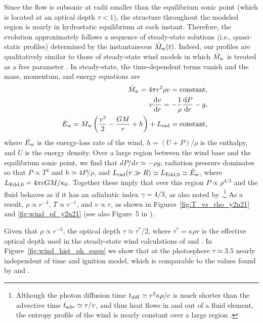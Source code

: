 \documentclass[apj,usenatbib, iop, twocolappendix]{emulateapj}
\newcommand{\Frad}{F}
\newcommand{\Lrad}{L_{\rm rad}}
\newcommand{\Mdot}{\dot{M}_{\rm w}}
\newcommand{\Edot}{\dot{E}_{\rm w}}
\newcommand{\diff}{\text{d}}
\begin{document}
Since the flow is subsonic at radii smaller than the equilibrium sonic point (which is located  at an optical depth $\tau<1$), the structure throughout the modeled region is nearly in hydrostatic equilibrium at each instant.  Therefore, the evolution approximately follows a sequence of steady-state solutions (i.e., quasi-static profiles) determined by the instantaneous $\Mdot(t)$. Indeed, our profiles are qualitatively similar to those of  steady-state wind models in which $\Mdot$ is treated as a free parameter \citep{Ebisuzaki:83, Kato:83, Paczynski:86, Joss:87}.  In steady-state, the time-dependent terms vanish and the mass, momentum, and energy equations are
\begin{eqnarray}
&& \Mdot =4\pi r^2 \rho v = {\rm constant}, \label{eq:mass_cons}\\
&&v\frac{\diff v}{\diff r} = -\frac{1}{\rho}\frac{\diff P}{\diff r} - g, \label{eq:momentum_cons}\\
&&\Edot=\Mdot \left(\frac{v^2}{2} - \frac{GM}{r} + h \right) + \Lrad =  {\rm constant}, \label{eq:E_cons}
\end{eqnarray}
where $\Edot$ is the energy-loss rate of the wind, $h=(U+P)/\rho$ is the enthalpy, and $U$ is the energy density.  Over a large region between the wind base and the equilibrium sonic point, we find that $dP/dr\simeq -\rho g$, radiation pressure dominates so that $P \propto T^4$ and $h\simeq 4P/\rho$, and $\Lrad(r\gg R)\simeq L_{\rm Edd, 0}\simeq \Edot$, where $L_{\rm Edd,0}=4\pi cGM/\kappa_0$.  Together these imply that over this region $P\propto \rho^{4/3}$ and the fluid behaves as if it has an adiabatic index $\gamma=4/3$, as also noted by \citet{Kato:86}.\footnote{Although the photon diffusion time $t_{\rm diff}\simeq r^2\kappa \rho /c$ is much shorter than the advective time $t_{\rm adv}\simeq r/v$, and thus heat flows in and out of a fluid element, the entropy profile of the wind is nearly constant over a large region \citep{Kato:86}.}  As a result, $\rho \propto r^{-3}$, $T \propto r^{-1}$, and $v \propto r$, as shown in  Figures~\ref{fig:T_vs_rho_y2n21} and \ref{fig:wind_pf_y2n21} (see also Figure~5 in \citealt{Paczynski:86}). 

Given that $\rho\propto r^{-3}$, the optical depth $\tau \simeq \tau^\ast/2$, where $\tau^\ast=\kappa\rho r$ is the effective optical depth used in the steady-state wind calculations of \citet{Quinn:85} and \citet{Paczynski:86}.  In Figure~\ref{fig:wind_hist_ph_supp} we show that at the photosphere $\tau\simeq 3.5$ nearly independent of time and ignition model, which is comparable to the values found by  \citet{Quinn:85} and \citet{Paczynski:86}. 
\end{document}
